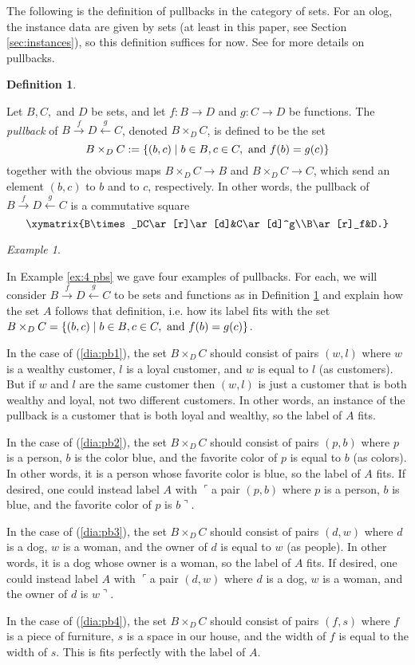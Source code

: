 \documentclass{amsart}
\def\to{\rightarrow}
\def\To{\xrightarrow}
\def\taking{\colon}
\def\To{\xrightarrow}
\def\From{\xleftarrow}
\def\cross{\times}
\newcommand{\fakebox}[1]{\tn{$\ulcorner$#1$\urcorner$}}
\theoremstyle{remark}
\newtheorem{example}[theorem]{Example}
\theoremstyle{definition}
\newtheorem{definition}[theorem]{Definition}
\def\tn{\textnormal}
\begin{document}
The following is the definition of pullbacks in the category of sets. For an olog, the instance data are given by sets (at least in this paper, see Section \ref{sec:instances}), so this definition suffices for now. See \cite{Awo} for more details on pullbacks.

\begin{definition}\label{def:pullback}

Let $B, C,$ and $D$ be sets, and let $f\taking B\to D$ and $g\taking C\to D$ be functions. The {\em pullback} of $B\To{f}D\From{g}C$, denoted $B\cross_DC$, is defined to be the set $$B\cross_DC:=\{(b,c)\;|\; b\in B, c\in C, \tn{ and } f(b)=g(c)\}$$ together with the obvious maps $B\cross_DC\to B$ and $B\cross_DC\to C$, which send an element $(b,c)$ to $b$ and to $c$, respectively. In other words, the pullback of $B\To{f}D\From{g}C$ is a commutative square $$\xymatrix{B\cross_DC\ar[r]\ar[d]&C\ar[d]^g\\B\ar[r]_f&D.}$$

\end{definition}

\begin{example}\label{ex:justify pb example}

In Example \ref{ex:4 pbs} we gave four examples of pullbacks. For each, we will consider $B\To{f}D\From{g}C$ to be sets and functions as in Definition \ref{def:pullback} and explain how the set $A$ follows that definition, i.e. how its label fits with the set $B\cross_DC=\{(b,c)\;|\; b\in B, c\in C, \tn{ and } f(b)=g(c)\}$.

In the case of (\ref{dia:pb1}), the set $B\cross_DC$ should consist of pairs $(w,l)$ where $w$ is a wealthy customer, $l$ is a loyal customer, and $w$ is equal to $l$ (as customers). But if $w$ and $l$ are the same customer then $(w,l)$ is just a customer that is both wealthy and loyal, not two different customers. In other words, an instance of the pullback is a customer that is both loyal and wealthy, so the label of $A$ fits.

In the case of (\ref{dia:pb2}), the set $B\cross_DC$ should consist of pairs $(p,b)$ where $p$ is a person, $b$ is the color blue, and the favorite color of $p$ is equal to $b$ (as colors). In other words, it is a person whose favorite color is blue, so the label of $A$ fits. If desired, one could instead label $A$ with \fakebox{a pair $(p,b)$ where $p$ is a person, $b$ is blue, and the favorite color of $p$ is $b$}.

In the case of (\ref{dia:pb3}), the set $B\cross_DC$ should consist of pairs $(d,w)$ where $d$ is a dog, $w$ is a woman, and the owner of $d$ is equal to $w$ (as people). In other words, it is a dog whose owner is a woman, so the label of $A$ fits. If desired, one could instead label $A$ with \fakebox{a pair $(d,w)$ where $d$ is a dog, $w$ is a woman, and the owner of $d$ is $w$}.

In the case of (\ref{dia:pb4}), the set $B\cross_DC$ should consist of pairs $(f,s)$ where $f$ is a piece of furniture, $s$ is a space in our house, and the width of $f$ is equal to the width of $s$. This is fits perfectly with the label of $A$.

\end{example}
\end{document}
